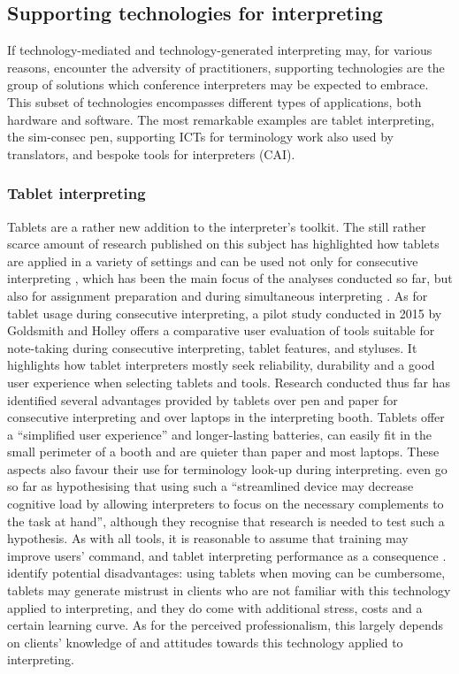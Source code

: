 \subsection{Supporting technologies for interpreting} \label{tech_support}
If technology-mediated and technology-generated interpreting may, for various reasons, encounter the adversity of practitioners, supporting technologies are the group of solutions which conference interpreters may be expected to embrace. This subset of technologies encompasses different types of applications, both hardware and software. The most remarkable examples are tablet interpreting, the sim-consec pen, supporting ICTs for terminology work also used by translators, and bespoke tools for interpreters (CAI).

\subsubsection{Tablet interpreting}
Tablets are a rather new addition to the interpreter's toolkit. The still rather scarce amount of research published on this subject has highlighted how tablets are applied in a variety of settings and can be used not only for consecutive interpreting \citep{rosado_note_2013,behl_paperless_2013-1,behl_paperless_2013,goldsmith_consecutive_2015,goldsmith_comparative_2017,drechsel_tablet_2016}, which has been the main focus of the analyses conducted so far, but also for assignment preparation and during simultaneous interpreting \citep{paone_mobile_2016}. As for tablet usage during consecutive interpreting, a pilot study conducted in 2015 by Goldsmith and Holley offers a comparative user evaluation of tools suitable for note-taking during consecutive interpreting, tablet features, and styluses. It highlights how tablet interpreters mostly seek reliability, durability and a good user experience when selecting tablets and tools. Research conducted thus far has identified several advantages provided by tablets over pen and paper for consecutive interpreting and over laptops in the interpreting booth. Tablets offer a ``simplified user experience'' \citep[11]{drechsel_tablet_2016} and longer-lasting batteries, can easily fit in the small perimeter of a booth and are quieter than paper and most laptops. These aspects also favour their use for terminology look-up during interpreting. \citet[17]{drechsel_tablet_2016} even go so far as hypothesising that using such a ``streamlined device may decrease cognitive load by allowing interpreters to focus on the necessary complements to the task at hand'', although they recognise that research is needed to test such a hypothesis. As with all tools, it is reasonable to assume that training may improve users' command, and tablet interpreting performance as a consequence \citep[43]{goldsmith_comparative_2017}. \citet{goldsmith_consecutive_2015} identify potential disadvantages: using tablets when moving can be cumbersome, tablets may generate mistrust in clients who are not familiar with this technology applied to interpreting, and they do come with additional stress, costs and a certain learning curve. As for the perceived professionalism, this largely depends on clients' knowledge of and attitudes towards this technology applied to interpreting.

